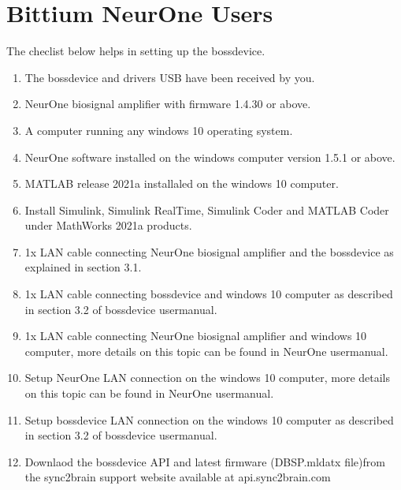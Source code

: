 \documentclass[letterpaper,10pt,english]{sphinxmanual}
\begin{document}
\section{Bittium NeurOne Users}
\label{\detokenize{1b_GettingStartedCheckList:bittium-neurone-users}}
\sphinxAtStartPar
The checlist below helps in setting up the bossdevice.
\begin{enumerate}
%
\item {} 
\sphinxAtStartPar
The bossdevice and drivers USB have been received by you.

\item {} 
\sphinxAtStartPar
NeurOne biosignal amplifier with firmware 1.4.30 or above.

\item {} 
\sphinxAtStartPar
A computer running any windows 10 operating system.

\item {} 
\sphinxAtStartPar
NeurOne software installed on the windows computer version 1.5.1 or above.

\item {} 
\sphinxAtStartPar
MATLAB release 2021a installaled on the windows 10 computer.

\item {} 
\sphinxAtStartPar
Install Simulink, Simulink Real\sphinxhyphen{}Time, Simulink Coder and MATLAB Coder under MathWorks 2021a products.

\item {} 
\sphinxAtStartPar
1x LAN cable connecting NeurOne biosignal amplifier and the bossdevice as explained in section 3.1.

\item {} 
\sphinxAtStartPar
1x LAN cable connecting bossdevice and windows 10 computer as described in section 3.2 of bossdevice usermanual.

\item {} 
\sphinxAtStartPar
1x LAN cable connecting NeurOne biosignal amplifier and windows 10 computer, more details on this topic can be found in NeurOne usermanual.

\item {} 
\sphinxAtStartPar
Setup NeurOne LAN connection on the windows 10 computer, more details on this topic can be found in NeurOne usermanual.

\item {} 
\sphinxAtStartPar
Setup bossdevice LAN connection on the windows 10 computer as described in section 3.2 of bossdevice usermanual.

\item {} 
\sphinxAtStartPar
Downlaod the bossdevice API and latest firmware (DBSP.mldatx file)from the sync2brain support website available at api.sync2brain.com

\end{enumerate}
\end{document}

